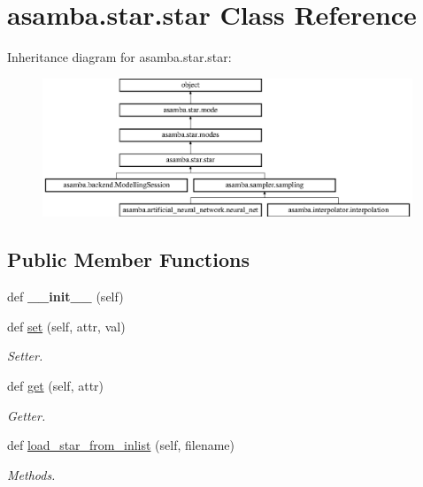 \hypertarget{classasamba_1_1star_1_1star}{}\section{asamba.\+star.\+star Class Reference}
\label{classasamba_1_1star_1_1star}
Inheritance diagram for asamba.\+star.\+star\+:\begin{figure}[H]
\begin{center}
\leavevmode
\includegraphics[height=4.148148cm]{classasamba_1_1star_1_1star}
\end{center}
\end{figure}
\subsection*{Public Member Functions}
\begin{DoxyCompactItemize}
\item 
\mbox{\label{classasamba_1_1star_1_1star_a5e1bfb2e0171a571b99aeb125afde4a4}} 
def {\bfseries \+\_\+\+\_\+init\+\_\+\+\_\+} (self)
\item 
def \hyperlink{classasamba_1_1star_1_1star_af0cfdd4049f081617d13919decddc5af}{set} (self, attr, val)
\begin{DoxyCompactList}\small\item\em Setter. \end{DoxyCompactList}\item 
def \hyperlink{classasamba_1_1star_1_1star_a388403867f4905df1f6c983131535379}{get} (self, attr)
\begin{DoxyCompactList}\small\item\em Getter. \end{DoxyCompactList}\item 
def \hyperlink{classasamba_1_1star_1_1star_aec75624cd5c21ff1f0121012ccb01903}{load\+\_\+star\+\_\+from\+\_\+inlist} (self, filename)
\begin{DoxyCompactList}\small\item\em Methods. \end{DoxyCompactList}\end{DoxyCompactItemize}
